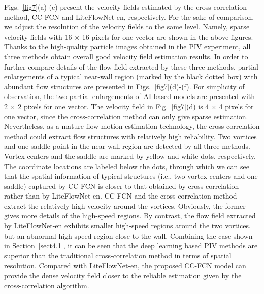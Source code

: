 \documentclass[%
 aip,
 amsmath,amssymb,
 reprint,%
]{revtex4-1}
\begin{document}
Figs.~\ref{fig7}(a)-(c) present the velocity fields estimated by the cross-correlation method, CC-FCN and LiteFlowNet-en, respectively.
For the sake of comparison, we adjust the resolution of the velocity fields to the same level. Namely, sparse velocity fields with 16 $\times$ 16 pixels for one vector are shown in the above figures.
Thanks to the high-quality particle images obtained in the PIV experiment, all three methods obtain overall good velocity field estimation results.
In order to further compare details of the flow field extracted by these three methods, partial enlargements of a typical near-wall region (marked by the black dotted box) with abundant flow structures are presented in Figs.~\ref{fig7}(d)-(f).
For simplicity of observation, the two partial enlargements of AI-based models are presented with 2 $\times$ 2 pixels for one vector. The velocity field in Fig.~\ref{fig7}(d) is 4 $\times$ 4 pixels for one vector, since  the cross-correlation method can only give sparse estimation.
Nevertheless, as a mature flow motion estimation technology, the cross-correlation method could extract flow structures with relatively high reliability.
Two vortices and one saddle point in the near-wall region are detected by all three methods. Vortex centers and the saddle are marked by yellow and white dots, respectively. 
The coordinate locations are labeled below the dots, through which we can see that the spatial information of typical structures (i.e., two vortex centers and one saddle) captured by CC-FCN is closer to that obtained by cross-correlation rather than by LiteFlowNet-en. 
CC-FCN and the cross-correlation method extract the relatively high velocity around the vortices. Obviously, the former gives more details of the high-speed regions.
By contrast, the flow field extracted by LiteFlowNet-en exhibits smaller high-speed regions around the two vortices, but an abnormal high-speed region close to the wall.
Combining the case shown in Section~\ref{sect4.1}, it can be seen that the deep learning based PIV methods are superior than the traditional cross-correlation method in terms of spatial resolution.
Compared with LiteFlowNet-en, the proposed CC-FCN model can provide the dense velocity field closer to the reliable estimation given by the cross-correlation algorithm.

\end{document}
